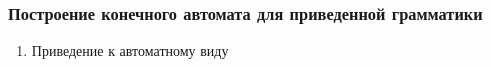 \subsubsection{Построение конечного автомата для приведенной грамматики}
\begin{enumerate}
	\item Приведение к автоматному виду
\end{enumerate}
